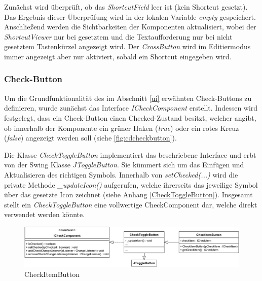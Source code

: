 \vspace{20px}



Zunächst wird überprüft, ob das \emph{ShortcutField} leer ist (kein Shortcut gesetzt). Das Ergebnis dieser Überprüfung wird in der lokalen Variable \emph{empty} gespeichert. Anschließend werden die Sichtbarkeiten der Komponenten aktualisiert, wobei der \emph{ShortcutViewer} nur bei gesetztem und die Textaufforderung nur bei nicht gesetztem Tastenkürzel angezeigt wird. Der \emph{CrossButton} wird im Editiermodus immer angezeigt aber nur aktiviert, sobald ein Shortcut eingegeben wird.

\newpage

\subsubsection{Check-Button}

\vspace{-3px}

Um die Grundfunktionalität des im Abschnitt \ref{ui} erwähnten Check-Buttons zu definieren, wurde zunächst das Interface \emph{ICheckComponent} erstellt. Indessen wird festgelegt, dass ein Check-Button einen Checked-Zustand besitzt, welcher angibt, ob innerhalb der Komponente ein grüner Haken (\emph{true}) oder ein rotes Kreuz (\emph{false}) angezeigt werden soll (siehe \autoref{fig:cdcheckbutton}).

Die Klasse \emph{CheckToggleButton} implementiert das beschriebene Interface und erbt von der Swing Klasse \emph{JToggleButton}. Sie kümmert sich um das Einfügen und Aktualisieren des richtigen Symbols. Innerhalb von \emph{setChecked(...)} wird die private Methode \emph{\_updateIcon()} aufgerufen, welche ihrerseits das jeweilige Symbol über das gesetzte Icon zeichnet (siehe Anhang \ref{CheckToggleButton}). Insgesamt stellt ein \emph{CheckToggleButton} eine vollwertige CheckComponent dar, welche direkt verwendet werden könnte.

\begin{figure}[H]
	\centering
	\includegraphics[width=1\linewidth]{../graphic/diagrams/CD_CheckButton/CD_CheckButton}
	\caption{CheckItemButton}
	\label{fig:cdcheckbutton}
\end{figure}

